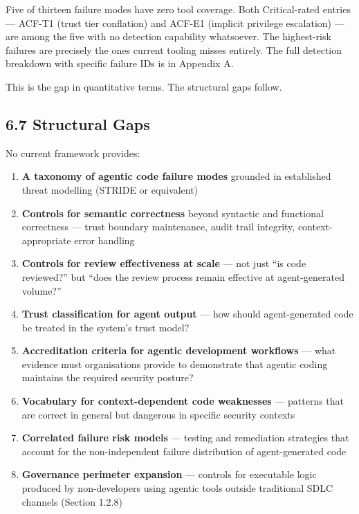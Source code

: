 \documentclass[a4paper,11pt]{report}
\providecommand{\tightlist}{%
  \setlength{\itemsep}{0pt}\setlength{\parskip}{0pt}}
\begin{document}
Five of thirteen failure modes have zero tool coverage. Both
Critical-rated entries --- ACF-T1 (trust tier conflation) and ACF-E1
(implicit privilege escalation) --- are among the five with no detection
capability whatsoever. The highest-risk failures are precisely the ones
current tooling misses entirely. The full detection breakdown with
specific failure IDs is in Appendix A.

This is the gap in quantitative terms. The structural gaps follow.

\hypertarget{structural-gaps}{%
\subsection{6.7 Structural Gaps}\label{structural-gaps}}

No current framework provides:

\begin{enumerate}
\def\labelenumi{\arabic{enumi}.}
\tightlist
\item
  \textbf{A taxonomy of agentic code failure modes} grounded in
  established threat modelling (STRIDE or equivalent)
\item
  \textbf{Controls for semantic correctness} beyond syntactic and
  functional correctness --- trust boundary maintenance, audit trail
  integrity, context-appropriate error handling
\item
  \textbf{Controls for review effectiveness at scale} --- not just ``is
  code reviewed?'' but ``does the review process remain effective at
  agent-generated volume?''
\item
  \textbf{Trust classification for agent output} --- how should
  agent-generated code be treated in the system's trust model?
\item
  \textbf{Accreditation criteria for agentic development workflows} ---
  what evidence must organisations provide to demonstrate that agentic
  coding maintains the required security posture?
\item
  \textbf{Vocabulary for context-dependent code weaknesses} --- patterns
  that are correct in general but dangerous in specific security
  contexts
\item
  \textbf{Correlated failure risk models} --- testing and remediation
  strategies that account for the non-independent failure distribution
  of agent-generated code
\item
  \textbf{Governance perimeter expansion} --- controls for executable
  logic produced by non-developers using agentic tools outside
  traditional SDLC channels (Section 1.2.8)
\end{enumerate}
\end{document}
